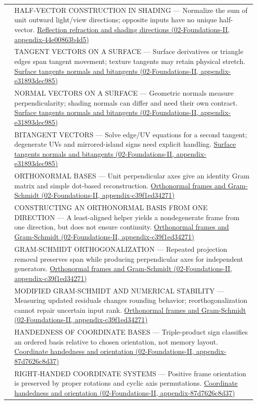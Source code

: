 {\begin{longtable}[]{@{}
  >{\raggedright\arraybackslash}p{}
  >{\raggedright\arraybackslash}p{}@{}}
555 & HALF-VECTOR CONSTRUCTION IN SHADING --- Normalize the sum of unit outward light/view directions; opposite inputs have no unique half-vector. \href{}{Reflection refraction and shading directions (02-Foundations-II, appendix-44e00863b4d5)} \\
556 & TANGENT VECTORS ON A SURFACE --- Surface derivatives or triangle edges span tangent movement; texture tangents may retain physical stretch. \href{}{Surface tangents normals and bitangents (02-Foundations-II, appendix-e31893dec985)} \\
557 & NORMAL VECTORS ON A SURFACE --- Geometric normals measure perpendicularity; shading normals can differ and need their own contract. \href{}{Surface tangents normals and bitangents (02-Foundations-II, appendix-e31893dec985)} \\
558 & BITANGENT VECTORS --- Solve edge/UV equations for a second tangent; degenerate UVs and mirrored-island signs need explicit handling. \href{}{Surface tangents normals and bitangents (02-Foundations-II, appendix-e31893dec985)} \\
559 & ORTHONORMAL BASES --- Unit perpendicular axes give an identity Gram matrix and simple dot-based reconstruction. \href{}{Orthonormal frames and Gram-Schmidt (02-Foundations-II, appendix-c39f1ed34271)} \\
560 & CONSTRUCTING AN ORTHONORMAL BASIS FROM ONE DIRECTION --- A least-aligned helper yields a nondegenerate frame from one direction, but does not ensure continuity. \href{}{Orthonormal frames and Gram-Schmidt (02-Foundations-II, appendix-c39f1ed34271)} \\
561 & GRAM-SCHMIDT ORTHOGONALIZATION --- Repeated projection removal preserves span while producing perpendicular axes for independent generators. \href{}{Orthonormal frames and Gram-Schmidt (02-Foundations-II, appendix-c39f1ed34271)} \\
562 & MODIFIED GRAM-SCHMIDT AND NUMERICAL STABILITY --- Measuring updated residuals changes rounding behavior; reorthogonalization cannot repair uncertain input rank. \href{}{Orthonormal frames and Gram-Schmidt (02-Foundations-II, appendix-c39f1ed34271)} \\
563 & HANDEDNESS OF COORDINATE BASES --- Triple-product sign classifies an ordered basis relative to chosen orientation, not memory layout. \href{}{Coordinate handedness and orientation (02-Foundations-II, appendix-87d7626c8d37)} \\
564 & RIGHT-HANDED COORDINATE SYSTEMS --- Positive frame orientation is preserved by proper rotations and cyclic axis permutations. \href{}{Coordinate handedness and orientation (02-Foundations-II, appendix-87d7626c8d37)} \\

\end{longtable}}
